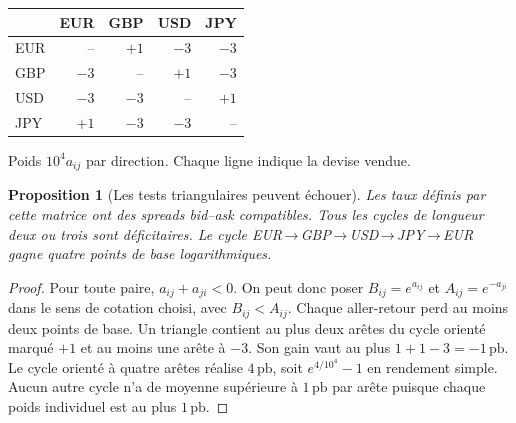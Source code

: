 \documentclass[11pt,a4paper]{article}
\theoremstyle{clair}
\newtheorem{proposition}{Proposition}[section]
\newcommand{\pb}{\,\mathrm{pb}}
\newcommand{\arrowfx}{\mathbin{\to}}
\begin{document}
\begin{minipage}[c]{0.48\textwidth}
\centering
{}
\end{minipage}\hfill
\begin{minipage}[c]{0.50\textwidth}
\centering
\small
\begin{tabular}{@{}lrrrr@{}}
\toprule
 & EUR & GBP & USD & JPY\\
\midrule
EUR & -- & $+1$ & $-3$ & $-3$\\
GBP & $-3$ & -- & $+1$ & $-3$\\
USD & $-3$ & $-3$ & -- & $+1$\\
JPY & $+1$ & $-3$ & $-3$ & --\\
\bottomrule
\end{tabular}

\vspace{2mm}
Poids $10^4a_{ij}$ par direction. Chaque ligne indique la devise vendue.
\end{minipage}

\begin{proposition}[Les tests triangulaires peuvent échouer]
Les taux définis par cette matrice ont des spreads bid--ask compatibles. Tous les cycles de longueur deux ou trois sont déficitaires. Le cycle EUR\,$\arrowfx$\,GBP\,$\arrowfx$\,USD\,$\arrowfx$\,JPY\,$\arrowfx$\,EUR gagne quatre points de base logarithmiques.
\end{proposition}
\begin{proof}
Pour toute paire, $a_{ij}+a_{ji}<0$. On peut donc poser $B_{ij}=e^{a_{ij}}$ et $A_{ij}=e^{-a_{ji}}$ dans le sens de cotation choisi, avec $B_{ij}<A_{ij}$. Chaque aller-retour perd au moins deux points de base. Un triangle contient au plus deux arêtes du cycle orienté marqué $+1$ et au moins une arête à $-3$. Son gain vaut au plus $1+1-3=-1\pb$. Le cycle orienté à quatre arêtes réalise $4\pb$, soit $e^{4/10^4}-1$ en rendement simple. Aucun autre cycle n'a de moyenne supérieure à $1\pb$ par arête puisque chaque poids individuel est au plus $1\pb$.
\end{proof}
\end{document}
